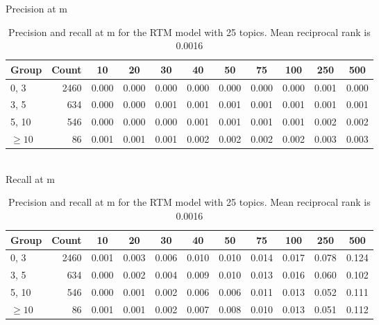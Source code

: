 \begin{table}{\small
Precision at m\\
\begin{tabular}{| l | r || c | c | c | c | c | c | c | c | c |}\hline
 Group    & Count &    10 &    20 &    30 &    40 &    50 &    75 &   100 &   250 &   500  \\
\hline
  0,    3 &      2460 & 0.000 & 0.000 & 0.000 & 0.000 & 0.000 & 0.000 & 0.000 & 0.001 & 0.000  \\
  3,    5 &       634 & 0.000 & 0.000 & 0.001 & 0.001 & 0.001 & 0.001 & 0.001 & 0.001 & 0.001  \\
  5,   10 &       546 & 0.000 & 0.000 & 0.000 & 0.001 & 0.001 & 0.001 & 0.001 & 0.002 & 0.002  \\
 $\geq 10$ &        86 & 0.001 & 0.001 & 0.001 & 0.002 & 0.002 & 0.002 & 0.002 & 0.003 & 0.003  \\
\hline\end{tabular}\\

Recall at m\\
\begin{tabular}{| l | r || c | c | c | c | c | c | c | c | c |}\hline
 Group    & Count &    10 &    20 &    30 &    40 &    50 &    75 &   100 &   250 &   500  \\ \hline
  0,    3 &      2460 & 0.001 & 0.003 & 0.006 & 0.010 & 0.010 & 0.014 & 0.017 & 0.078 & 0.124  \\
  3,    5 &       634 & 0.000 & 0.002 & 0.004 & 0.009 & 0.010 & 0.013 & 0.016 & 0.060 & 0.102  \\
  5,   10 &       546 & 0.000 & 0.001 & 0.002 & 0.006 & 0.006 & 0.011 & 0.013 & 0.052 & 0.111  \\
 $\geq 10$ &        86 & 0.001 & 0.001 & 0.002 & 0.007 & 0.008 & 0.010 & 0.013 & 0.051 & 0.112  \\
\hline\end{tabular}
\caption{Precision and recall at m for the RTM model with 25 topics. Mean reciprocal rank is 0.0016}\label{tbl:rtm}
}\end{table}

